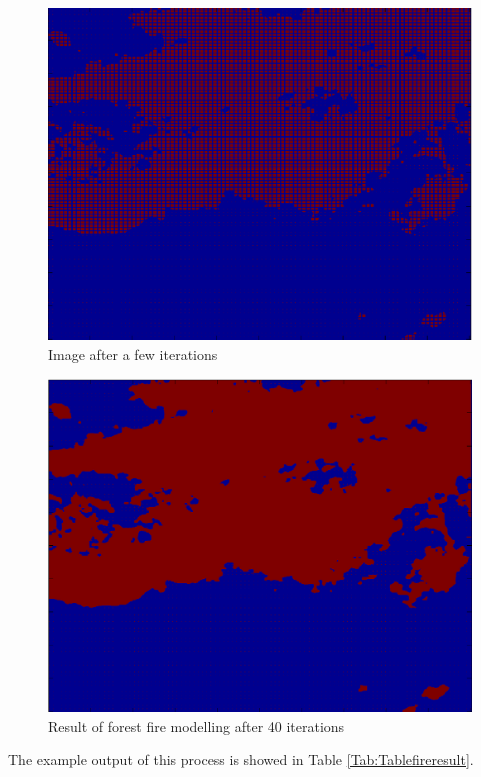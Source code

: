 \documentclass[review,12pt]{elsarticle}
\begin{document}
\begin{figure}
\center
\includegraphics[scale=0.5]{images/fireBeginingIteration.eps}
\caption{Image after a few iterations}
\label{fig:setingfire}
\end{figure}

\begin{figure}
\center
\includegraphics[scale=0.5]{images/firesresultNEW.eps}
\caption{Result of forest fire modelling after 40 iterations}
\label{fig:firesresult}
\end{figure}

The example output of this process is showed in Table \ref{Tab:Tablefireresult}.
\end{document}
